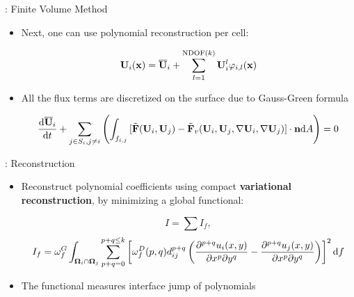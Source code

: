 \documentclass[aspectratio=169,serif]{beamer} %
\begin{document}
\begin{frame}{\secname: Finite Volume Method}
  \begin{itemize}
    \item Next, one can use polynomial reconstruction per cell:
          \begin{block}{}
            \begin{equation}
              \label{eq:FVRec}
              \mathbf{U}_i(\mathbf{x}) = \overline{\mathbf{U}}_i + \sum_{l=1}^{\mathrm{NDOF}(k)}{\mathbf{U}_i^l\varphi_{i,l}(\mathbf{x}) }
            \end{equation}
          \end{block}
    \item All the flux terms are discretized on the surface due to Gauss-Green formula
          \begin{block}{}
            \begin{equation}
              \label{eq:FVInt}
              \frac{\dd\overline{\mathbf{U}}_i}{\dd t}
              +\sum_{j\in S_i, j\neq i}{\left(
                \int_{f_{i,j}}{
                  [\tilde{\mathbf{F}}(\mathbf{U}_i,\mathbf{U}_j) - \tilde{\mathbf{F}}_v(\mathbf{U}_i,\mathbf{U}_j, \nabla \mathbf{U}_i, \nabla \mathbf{U}_j)] \cdot \mathbf{n}  \dd A
                }\right)
              }
              = 0
            \end{equation}
          \end{block}
  \end{itemize}
\end{frame}

\begin{frame}{\secname: Reconstruction}
  \begin{itemize}
    \item Reconstruct polynomial coefficients using compact
            {\bf variational reconstruction}\cite{wang2017compact_VR},
          by minimizing a global
          functional:
          \begin{block}{}
            \begin{equation}
              I = \sum{I_f},
            \end{equation}
            \begin{equation}
              I_f = \omega_f^G\int_{\OO_i \cap \OO_j}{
                \sum_{p+q=0}^{p + q\leq k}\left[
                  \omega_f^D(p,q)
                  d_{ij}^{p+q}
                  \left(
                  \partialderivative{^{p+q}u_i(x,y)}{x^p\partial y^q}
                  -
                  \partialderivative{^{p+q}u_j(x,y)}{x^p\partial y^q}
                  \right)
                  \right]^2
                \dd f
              }
            \end{equation}
          \end{block}
    \item The functional measures interface jump of polynomials
  \end{itemize}
\end{frame}
\end{document}
